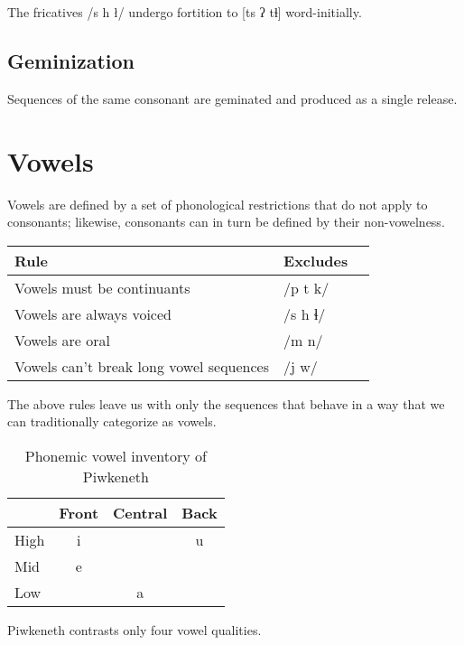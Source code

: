\documentclass[smallroyalvopaper,9pt]{memoir}
\newcommand{\lang}{Piwkeneth}
\newcommand{\bind}{\symbol{"0361}}
\begin{document}
The fricatives /s h ł/ undergo fortition to [t\bind{}s ʔ t\bind{}ɬ] word-initially.


\subsection{Geminization}

Sequences of the same consonant are geminated and produced as a single release.

\section{Vowels}

Vowels are defined by a set of phonological restrictions that do not apply to consonants; likewise, consonants can in turn be defined by their non-vowelness.

\begin{table}[ht]
    \centering
    \begin{tabular}{lll}
        \toprule
        Rule & Excludes \\
        \midrule
        Vowels must be continuants & /p t k/ \\
        Vowels are always voiced & /s h ɬ/ \\
        Vowels are oral & /m n/ \\
        Vowels can't break long vowel sequences & /j w/ \\
        \bottomrule
    \end{tabular}
\end{table}

The above rules leave us with only the sequences that behave in a way that we can traditionally categorize as vowels.

\begin{table}[ht]
    \centering
    \begin{tabular}{lccc}
        \toprule
        & Front & Central & Back \\
        \midrule
        High & i & & u \\
        Mid & e & &  \\
        Low & & a & \\
        \bottomrule
    \end{tabular}
    \caption{Phonemic vowel inventory of \lang}
\end{table}

\lang{} contrasts only four vowel qualities. 
\end{document}

